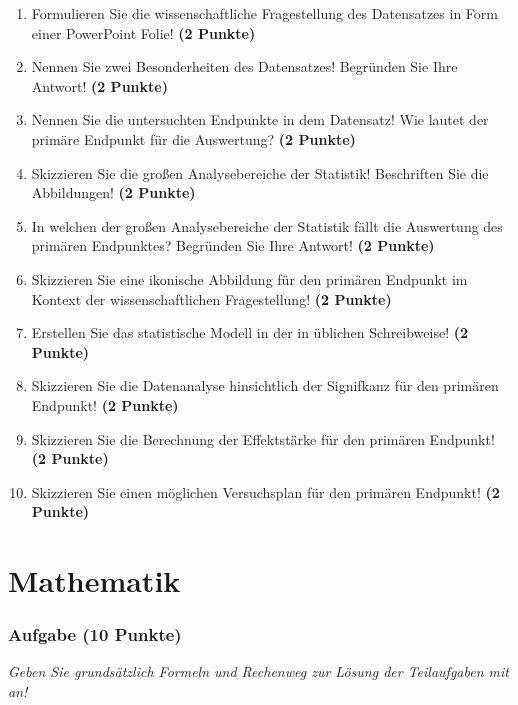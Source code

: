 \documentclass[a4paper, 9pt]{scrartcl}\usepackage[]{graphicx}\usepackage[]{xcolor}
\begin{document}
\begin{enumerate}
  \setcounter{enumi}{0}
  \item Formulieren Sie die wissenschaftliche Fragestellung des Datensatzes in Form einer PowerPoint Folie! \textbf{(2 Punkte)}
  \item Nennen Sie zwei Besonderheiten des Datensatzes! Begründen Sie Ihre Antwort! \textbf{(2 Punkte)}
  \item Nennen Sie die untersuchten Endpunkte in dem Datensatz! Wie lautet der primäre Endpunkt für die Auswertung? \textbf{(2 Punkte)}
  \item Skizzieren Sie die großen Analysebereiche der Statistik! Beschriften Sie die Abbildungen! \textbf{(2 Punkte)}
  \item In welchen der großen Analysebereiche der Statistik fällt die Auswertung des primären Endpunktes? Begründen Sie Ihre Antwort! \textbf{(2 Punkte)}
  \item Skizzieren Sie eine ikonische Abbildung für den primären Endpunkt im Kontext der wissenschaftlichen Fragestellung! \textbf{(2 Punkte)}
  \item Erstellen Sie das statistische Modell in der in \Rlogo üblichen Schreibweise! \textbf{(2 Punkte)}
  \item Skizzieren Sie die Datenanalyse hinsichtlich der Signifkanz für den primären Endpunkt! \textbf{(2 Punkte)}
  \item Skizzieren Sie die Berechnung der Effektstärke für den primären Endpunkt! \textbf{(2 Punkte)}
  \item Skizzieren Sie einen möglichen Versuchsplan für den primären Endpunkt! \textbf{(2 Punkte)}
\end{enumerate} 
\clearpage
\part{Mathematik}

\section{Aufgabe \hfill (10 Punkte)}

\textit{Geben Sie grundsätzlich Formeln und Rechenweg zur Lösung der Teilaufgaben mit an!} \\[1Ex]
 
\end{document}
